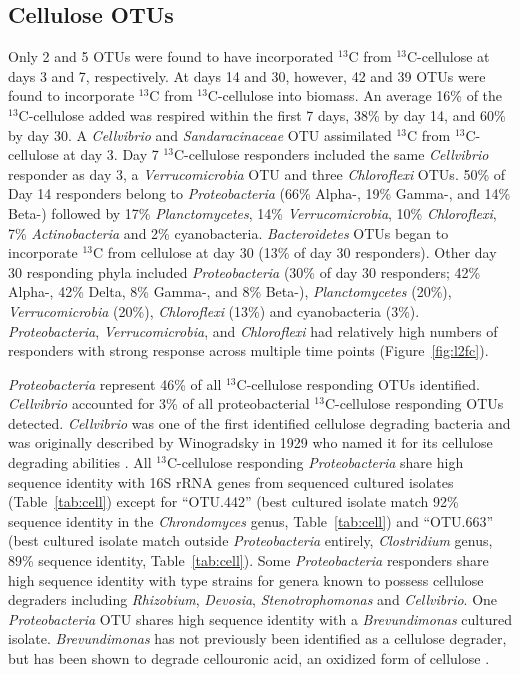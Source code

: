\subsection{Cellulose OTUs}
Only 2 and 5 OTUs were found to have incorporated $^{13}$C from
$^{13}$C-cellulose at days 3 and 7, respectively. At days 14 and 30, however,
42 and 39 OTUs were found to incorporate $^{13}$C from $^{13}$C-cellulose into
biomass. An average 16\% of the $^{13}$C-cellulose added was respired within
the first 7 days, 38\% by day 14, and 60\% by day 30.  A \textit{Cellvibrio}
and \textit{Sandaracinaceae} OTU assimilated $^{13}$C from $^{13}$C-cellulose
at day 3. Day 7 $^{13}$C-cellulose responders included the same
\textit{Cellvibrio} responder as day 3, a \textit{Verrucomicrobia} OTU and
three \textit{Chloroflexi} OTUs.  50\% of Day 14 responders belong to
\textit{Proteobacteria} (66\% Alpha-, 19\% Gamma-, and 14\% Beta-) followed by
17\% \textit{Planctomycetes}, 14\% \textit{Verrucomicrobia}, 10\%
\textit{Chloroflexi}, 7\% \textit{Actinobacteria} and 2\% cyanobacteria.
\textit{Bacteroidetes} OTUs began to incorporate $^{13}$C from cellulose at day
30 (13\% of day 30 responders). Other day 30 responding phyla included
\textit{Proteobacteria} (30\% of day 30 responders; 42\% Alpha-, 42\% Delta,
8\% Gamma-, and 8\% Beta-), \textit{Planctomycetes} (20\%),
\textit{Verrucomicrobia} (20\%), \textit{Chloroflexi} (13\%) and cyanobacteria
(3\%). \textit{Proteobacteria}, \textit{Verrucomicrobia}, and
\textit{Chloroflexi} had relatively high numbers of responders with strong
response across multiple time points (Figure~\ref{fig:l2fc}).

\textit{Proteobacteria} represent 46\% of all $^{13}$C-cellulose responding
OTUs identified. \textit{Cellvibrio} accounted for 3\% of all proteobacterial
$^{13}$C-cellulose responding OTUs detected. \textit{Cellvibrio} was one of the
first identified cellulose degrading bacteria and was originally described by
Winogradsky in 1929 who named it for its cellulose degrading abilities
\citep{boone2001bergeys}. All $^{13}$C-cellulose responding
\textit{Proteobacteria} share high sequence identity with 16S rRNA genes from
sequenced cultured isolates (Table~\ref{tab:cell}) except for ``OTU.442'' (best
cultured isolate match 92\% sequence identity in the \textit{Chrondomyces}
genus, Table~\ref{tab:cell}) and ``OTU.663'' (best cultured isolate match
outside \textit{Proteobacteria} entirely, \textit{Clostridium} genus, 89\%
sequence identity, Table~\ref{tab:cell}). Some \textit{Proteobacteria}
responders share high sequence identity with type strains for genera known to
possess cellulose degraders including \textit{Rhizobium}, \textit{Devosia},
\textit{Stenotrophomonas} and \textit{Cellvibrio}. One \textit{Proteobacteria}
OTU shares high sequence identity with a \textit{Brevundimonas} cultured
isolate.  \textit{Brevundimonas} has not previously been identified as a
cellulose degrader, but has been shown to degrade cellouronic acid, an oxidized
form of cellulose \citep{Tavernier_2008}.

